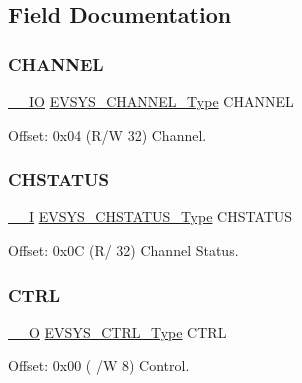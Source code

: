 \subsection{Field Documentation}
\mbox{\label{struct_evsys_a5fa220a46e9b6e08f41529e5cc12825b}} 
\subsubsection{\texorpdfstring{CHANNEL}{CHANNEL}}
{\footnotesize\ttfamily \mbox{\hyperlink{core__cm0plus_8h_aec43007d9998a0a0e01faede4133d6be}{\+\_\+\+\_\+\+IO}} \mbox{\hyperlink{union_e_v_s_y_s___c_h_a_n_n_e_l___type}{E\+V\+S\+Y\+S\+\_\+\+C\+H\+A\+N\+N\+E\+L\+\_\+\+Type}} C\+H\+A\+N\+N\+EL}



Offset\+: 0x04 (R/W 32) Channel. 

\mbox{\label{struct_evsys_a95f2dc8fdc7b2c046428198d970b32cf}} 
\subsubsection{\texorpdfstring{CHSTATUS}{CHSTATUS}}
{\footnotesize\ttfamily \mbox{\hyperlink{core__cm0plus_8h_af63697ed9952cc71e1225efe205f6cd3}{\+\_\+\+\_\+I}} \mbox{\hyperlink{union_e_v_s_y_s___c_h_s_t_a_t_u_s___type}{E\+V\+S\+Y\+S\+\_\+\+C\+H\+S\+T\+A\+T\+U\+S\+\_\+\+Type}} C\+H\+S\+T\+A\+T\+US}



Offset\+: 0x0C (R/ 32) Channel Status. 

\mbox{\label{struct_evsys_a2ef48ff0b6163d7c435c792a85e4d284}} 
\subsubsection{\texorpdfstring{CTRL}{CTRL}}
{\footnotesize\ttfamily \mbox{\hyperlink{core__cm0plus_8h_a7e25d9380f9ef903923964322e71f2f6}{\+\_\+\+\_\+O}} \mbox{\hyperlink{union_e_v_s_y_s___c_t_r_l___type}{E\+V\+S\+Y\+S\+\_\+\+C\+T\+R\+L\+\_\+\+Type}} C\+T\+RL}



Offset\+: 0x00 ( /W 8) Control. 

